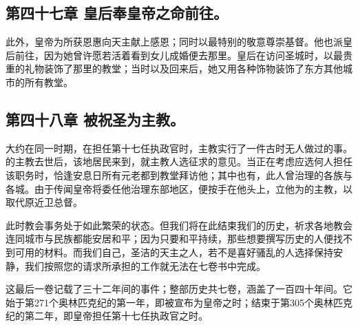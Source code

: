 
\subsection{第四十七章 皇后奉皇帝之命前往。}

此外，皇帝为所获恩惠向天主献上感恩；同时以最特别的敬意尊崇基督。他也派皇后前往，因为她曾许愿若活着看到女儿成婚便去那里。皇后在访问圣城时，以最贵重的礼物装饰了那里的教堂；当时以及回来后，她又用各种饰物装饰了东方其他城市的所有教堂。\par


\subsection{第四十八章 被祝圣为主教。}

大约在同一时期，在担任第十七任执政官时，主教实行了一件古时无人做过的事。的主教去世后，该地居民来到，就主教人选征求的意见。当正在考虑应选何人担任该职务时，恰逢安息日所有元老都到教堂拜访他；其中也有，此人曾治理的各族与各城。由于传闻皇帝将委任他治理东部地区，便按手在他头上，立他为的主教，以取代原近卫总督。\par

此时教会事务处于如此繁荣的状态。但我们将在此结束我们的历史，祈求各地教会连同城市与民族都能安居和平；因为只要和平持续，那些想要撰写历史的人便找不到可用的材料。而我们自己，圣洁的天主之人，若不是喜好骚乱的人选择保持安静，我们按照您的请求所承担的工作就无法在七卷书中完成。\par

这最后一卷记载了三十二年间的事件；整部历史共七卷，涵盖了一百四十年间。它始于第271个奥林匹克纪的第一年，即被宣布为皇帝之时；结束于第305个奥林匹克纪的第二年，即皇帝担任第十七任执政官之时。\par

